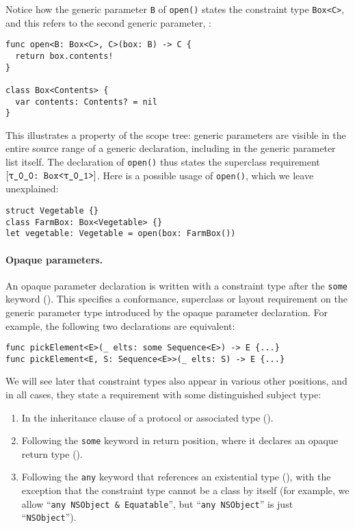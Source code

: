 \documentclass[../generics]{subfiles}
\begin{document}
\begin{example}
Notice how the generic parameter \texttt{B} of \texttt{open()} states the constraint type \texttt{Box<C>}, and this refers to the second generic parameter, \tC:
\begin{Verbatim}
func open<B: Box<C>, C>(box: B) -> C {
  return box.contents!
}

class Box<Contents> {
  var contents: Contents? = nil
}
\end{Verbatim}
This illustrates a property of the scope tree: generic parameters are visible in the entire source range of a generic declaration, including in the generic parameter list itself.
The declaration of \texttt{open()} thus states the superclass requirement $\ConfReq{\rT}{Box<\rU>}$. Here is a possible usage of \texttt{open()}, which we leave unexplained:
\begin{Verbatim}
struct Vegetable {}
class FarmBox: Box<Vegetable> {}
let vegetable: Vegetable = open(box: FarmBox())
\end{Verbatim}
\end{example}

\paragraph{Opaque parameters.}
An opaque parameter declaration is written with a constraint type after the \texttt{some} keyword (). This specifies a conformance, superclass or layout requirement on the generic parameter type introduced by the opaque parameter declaration. For example, the following two declarations are equivalent:
\begin{Verbatim}
func pickElement<E>(_ elts: some Sequence<E>) -> E {...}
func pickElement<E, S: Sequence<E>>(_ elts: S) -> E {...}
\end{Verbatim}

We will see later that constraint types also appear in various other positions, and in all cases, they state a requirement with some distinguished subject type:
\begin{enumerate}
\item In the inheritance clause of a protocol or associated type ().
\item Following the \texttt{some} keyword in return position, where it declares an opaque return type ().
\item Following the \texttt{any} keyword that references an existential type (), with the exception that the constraint type cannot be a class by itself (for example, we allow ``\verb|any NSObject & Equatable|'', but ``\verb|any NSObject|'' is just ``\texttt{NSObject}'').
\end{enumerate}
\end{document}
